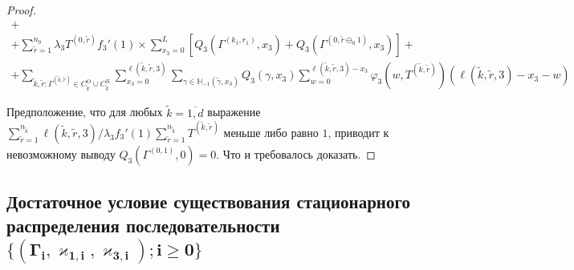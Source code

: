 \documentclass{report}
\begin{document}
\begin{proof}
\begin{multline}
 +\\+ \sum_{\tilde{r}=1}^{n_0} \lambda_3 T^{(0,\tilde{r})} f_3'(1)  \times \sum_{x_3=0}^{L} \left[ Q_3(\Gamma^{(k_1,r_1)},x_3) + Q_3(\Gamma^{(0,\tilde{r}\ominus_0 1)},x_3) \right]   +\\+  \sum_{\tilde{k},\tilde{r}\colon \Gamma^{(\tilde{k}, \tilde{r})} \in C_{\tilde{k}}^{\mathrm{O}}\cup C_{\tilde{k}}^{\mathrm{N}}} \sum_{x_3=0}^{\ell(\tilde{k},\tilde{r},3)}\sum_{\gamma \in {\mathbb H}_{-1}(\tilde{\gamma},x_3)} Q_3(\gamma,x_3) \sum_{w=0}^{\ell(\tilde{k},\tilde{r},3) - x_3} \varphi_3(w,T^{(\tilde{k},\tilde{r})}) (\ell(\tilde{k},\tilde{r},3)-x_3 - w)
 \label{neccessary:to:paste:one}
\end{multline}


Предположение, что для любых $\tilde{k}=\overline{1,d}$  выражение $\sum_{\tilde{r} = 1}^{n_{\tilde{k}}}\ell(\tilde{k},\tilde{r},3) \big/\lambda_3 f_3'(1) \sum_{\tilde{r} = 1}^{n_{\tilde{k}}} T^{(\tilde{k},\tilde{r})}   $ меньше либо равно $1$, приводит к невозможному выводу $Q_3(\Gamma^{(0,1)},0) = 0$. Что и требовалось доказать.

\end{proof}

















\subsection[Достаточное условие существования стационарного распределения последовательности $\{(\Gamma_i, \varkappa_{1,i},\varkappa_{3,i}); i \geqslant 0\}$]{Достаточное условие существования стационарного распределения последовательности $\boldsymbol{\{(\Gamma_i, \varkappa_{1,i},\varkappa_{3,i}); i \geqslant 0\}}$}
\end{document}
